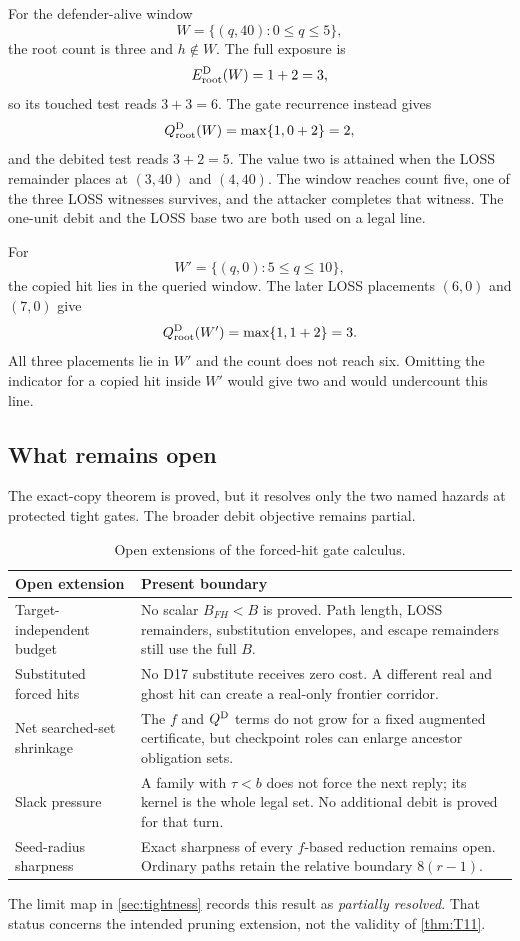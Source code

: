 For the defender-alive window
\[
W=\{(q,40):0\le q\le5\},
\]
the root count is three and $h\notin W$.  The full exposure is
\[
E_{\mathrm{root}}^{\mathrm{D}}(W)=1+2=3,
\]
so its touched test reads $3+3=6$.  The gate recurrence instead gives
\[
Q_{\mathrm{root}}^{\mathrm{D}}(W)=\max\{1,0+2\}=2,
\]
and the debited test reads $3+2=5$.  The value two is attained when the LOSS
remainder places at $(3,40)$ and $(4,40)$.  The window reaches count five,
one of the three LOSS witnesses survives, and the attacker completes that
witness.  The one-unit debit and the LOSS base two are both used on a legal
line.

For
\[
W'=\{(q,0):5\le q\le10\},
\]
the copied hit lies in the queried window.  The later LOSS placements
$(6,0)$ and $(7,0)$ give
\[
Q_{\mathrm{root}}^{\mathrm{D}}(W')=\max\{1,1+2\}=3.
\]
All three placements lie in $W'$ and the count does not reach six.  Omitting
the indicator for a copied hit inside $W'$ would give two and would undercount
this line.

\subsection{What remains open}

The exact-copy theorem is proved, but it resolves only the two named hazards
at protected tight gates.  The broader debit objective remains partial.

\begin{table}[tbp]
\centering
\small
\begin{tabular}{@{}p{.24\linewidth}p{.68\linewidth}@{}}
\toprule
Open extension & Present boundary \\
\midrule
Target-independent budget & No scalar $B_{FH}<B$ is proved.  Path length,
LOSS remainders, substitution envelopes, and escape remainders still use the
full $B$. \\
Substituted forced hits & No D17 substitute receives zero cost.  A different
real and ghost hit can create a real-only frontier corridor. \\
Net searched-set shrinkage & The $f$ and $Q^{\mathrm{D}}$ terms do not grow for a fixed
augmented certificate, but checkpoint roles can enlarge ancestor obligation
sets. \\
Slack pressure & A family with $\tau<b$ does not force the next reply; its
kernel is the whole legal set.  No additional debit is proved for that turn. \\
Seed-radius sharpness & Exact sharpness of every $f$-based reduction remains
open.  Ordinary paths retain the relative boundary $8(r-1)$. \\
\bottomrule
\end{tabular}
\caption{Open extensions of the forced-hit gate calculus.}
\label{tab:gate-gaps}
\end{table}

The limit map in \cref{sec:tightness} records this result as
\emph{partially resolved}.  That status concerns the intended pruning
extension, not the validity of \cref{thm:T11}.

